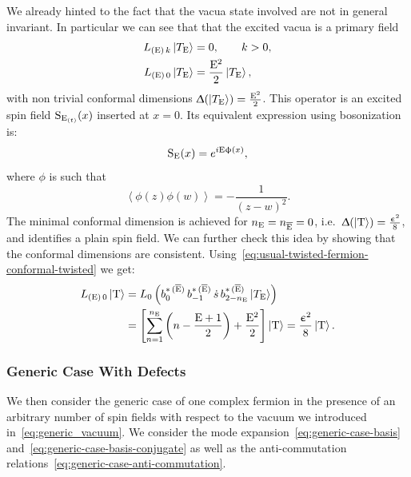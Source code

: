 We already hinted to the fact that the vacua state involved are not in general  invariant.
In particular we can see that that the excited vacua \eexcvacket is a primary field
\begin{equation}
  \begin{split}
    L_{(\mathrm{E})\, k} \ket{T_{\mathrm{E}}}
    & =
    0,
    \qquad
    k > 0,
    \\
    L_{(\mathrm{E})\, 0} \ket{T_{\mathrm{E}}}
    & =
    \frac{\mathrm{E}^2}{2} \ket{T_{\mathrm{E}}},
  \end{split}
\end{equation}
with non trivial conformal dimensions $\Updelta\qty( \ket{T_{\mathrm{E}}} ) =  \frac{\mathrm{E}^2}{2}$.
This operator is an excited spin field $\mathrm{S}_{\mathrm{E}_{(t)}}\qty( x )$ inserted at $x = 0$.
Its equivalent expression using bosonization is:
\begin{equation}
  \mathrm{S}_{\mathrm{E}}\qty( x ) = e^{i \mathrm{E} \upphi( x )},
\end{equation}
where $\phi$ is such that
\begin{equation}
  \left\langle \phi( z ) \phi( w ) \right\rangle
  =
  -\frac{1}{( z - w)^2}.
\end{equation}
The minimal conformal dimension is achieved for $n_{\mathrm{E}}=n_{\overline{\mathrm{E}}}=0$, i.e.\ $\Updelta\qty( \ket{\mathrm{T}} ) =  \frac{\upepsilon^2}{8}$, and identifies a plain spin field.
We can further check this idea  by showing that the conformal dimensions are consistent.
Using~\eqref{eq:usual-twisted-fermion-conformal-twisted} we get:
\begin{equation}
  \begin{split}
    L_{(\rE)\, 0} \twsvacket
    & =
    L_0\,
    \qty(%
      b^{*\, ( \brE )}_0\,
      b^{*\, ( \brE )}_{-1}\,
      \dots\,
      b^{*\, ( \brE )}_{2-n_{\rE}}
      \eexcvacket
    )
    \\
    & =
    \left[%
      \finitesum{n}{1}{n_{\rE}}
      \qty( n - \frac{\rE +  1}{2} )
      +
      \frac{\rE^2}{2}
    \right]
    \twsvacket
    =
    \frac{\epsilon^2}{8} \twsvacket.
  \end{split}
\end{equation}


\subsubsection{Generic Case With Defects}

We then consider the generic case of one complex fermion in the presence of an arbitrary number of spin fields with respect to the vacuum we introduced in~\eqref{eq:generic_vacuum}.
We consider the mode expansion~\eqref{eq:generic-case-basis} and~\eqref{eq:generic-case-basis-conjugate} as well as the anti-commutation relations~\eqref{eq:generic-case-anti-commutation}.

